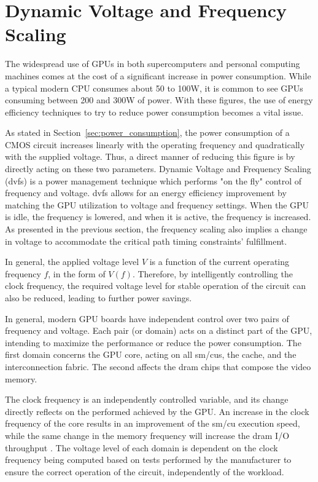 \section{Dynamic Voltage and Frequency Scaling}
\label{section:DVFS}

The widespread use of GPUs in both supercomputers and personal computing machines comes at the cost of a significant increase in power consumption. While a typical modern CPU consumes about 50 to 100W, it is common to see GPUs consuming between 200 and 300W of power. With these figures, the use of energy efficiency techniques to try to reduce power consumption becomes a vital issue.

As stated in Section~\ref{sec:power_consumption}, the power consumption of a CMOS circuit increases linearly with the operating frequency and quadratically with the supplied voltage. Thus, a direct manner of reducing this figure is by directly acting on these two parameters. 
Dynamic Voltage and Frequency Scaling (\acrshort{dvfs}) is a power management technique which performs "on the fly" control of frequency and voltage. \acrshort{dvfs} allows for an energy efficiency improvement by matching the GPU utilization to voltage and frequency settings. When the GPU is idle, the frequency is lowered, and when it is active, the frequency is increased. As presented in the previous section, the frequency scaling also implies a change in voltage to accommodate the critical path timing constraints' fulfillment. 

In general, the applied voltage level $V$ is a function of the current operating frequency $f$, in the form of $V(f)$. Therefore, by intelligently controlling the clock frequency, the required voltage level for stable operation of the circuit can also be reduced, leading to further power savings.

In general, modern GPU boards have independent control over two pairs of frequency and voltage. Each pair (or domain) acts on a distinct part of the GPU, intending to maximize the performance or reduce the power consumption. The first domain concerns the GPU core, acting on all \acrshort{sm}/\acrshort{cu}s, the cache, and the interconnection fabric. The second affects the \acrshort{dram} chips that compose the video memory. 

The clock frequency is an independently controlled variable, and its change directly reflects on the performed achieved by the GPU. An increase in the clock frequency of the core results in an improvement of the \acrshort{sm}/\acrshort{cu} execution speed, while the same change in the memory frequency will increase the \acrshort{dram} I/O throughput \cite{mei_survey_2016}. The voltage level of each domain is dependent on the clock frequency being computed based on tests performed by the manufacturer to ensure the correct operation of the circuit, independently of the workload.

